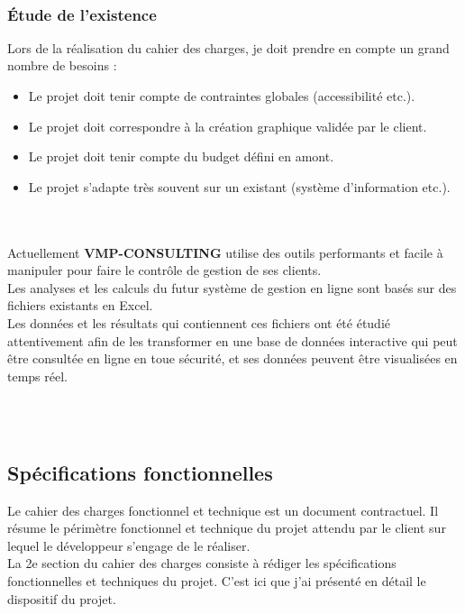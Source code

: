 \documentclass[12pt]{article}
\begin{document}
\\



\subsubsection{Étude de l’existence}

Lors de la réalisation du cahier des charges, je doit prendre en compte un grand nombre de besoins :
\begin{itemize}



\item Le projet doit tenir compte de contraintes globales (accessibilité etc.).

\item Le projet doit correspondre à la création graphique validée par le client.

 \item Le projet doit tenir compte du budget défini en amont.

 \item   Le projet s’adapte très souvent sur un existant (système d’information etc.).

\end{itemize} \\
\\

Actuellement \textbf{VMP-CONSULTING} utilise  des outils performants et facile à manipuler 
pour faire le contrôle de gestion de ses clients.\\
Les analyses et les calculs du futur système de gestion en ligne sont basés
sur des fichiers existants en Excel.\\

Les données et les résultats qui contiennent ces fichiers ont été étudié attentivement afin de les transformer en  une base de données interactive qui peut être consultée en ligne en toue sécurité, et ses données peuvent être visualisées en temps réel.

\\
\\








\subsection{ Spécifications fonctionnelles}


Le cahier des charges fonctionnel et technique est un document contractuel. Il résume le périmètre fonctionnel et technique du projet attendu par le client sur lequel le développeur s’engage de le réaliser.\\
La 2e section du cahier des charges consiste à rédiger les spécifications fonctionnelles et techniques du projet. C’est ici que j'ai  présenté en détail le dispositif du projet. \\
\end{document}
